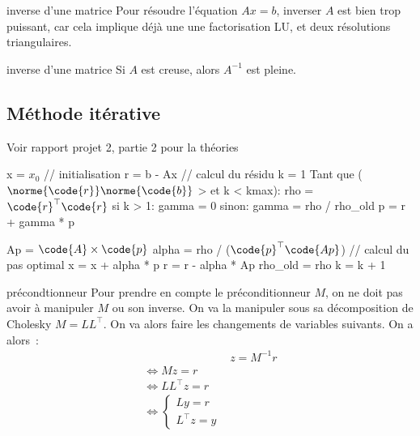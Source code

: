 \begin{remarque}{}{inverse d'une matrice}
    Pour résoudre l'équation $Ax=b$, inverser $A$ est bien trop puissant, car cela implique déjà une une factorisation LU, et deux résolutions triangulaires.
\end{remarque}

\begin{remarque}{}{inverse d'une matrice}   
    Si $A$ est creuse, alors $A^{-1}$ est pleine.
\end{remarque}


\subsection{Méthode itérative}

Voir rapport projet 2, partie 2 pour la théories


\begin{lstLNat}
    x = $x_0$ // initialisation
    r = b - Ax // calcul du résidu
    k = 1
    Tant que ($\norme{\code{r}} \norme{\code{b}}$ > \varepsilon et k < kmax):
        rho = $\code{r}^\top\code{r}$
         si k > 1:
            gamma = 0
        sinon:
            gamma = rho / rho\_old
        p = r + gamma * p
        
        Ap = $\code{A} \times \code{p}$ 
        alpha = rho / ($\code{p}^\top \code{Ap}$) // calcul du pas optimal
        x = x + alpha * p
        r = r - alpha * Ap
        rho\_old = rho
        k = k + 1
\end{lstLNat}

\begin{remarque}{}{précondtionneur}
    Pour prendre en compte le préconditionneur $M$, on ne doit pas avoir à manipuler $M$ ou son inverse. On va la manipuler sous sa décomposition de Cholesky $M = LL^\top$. On va alors faire les changements de variables suivants. On a alors~:
    \begin{align*}
        &z = M^{-1}r \\
        \iff Mz = r \\
        \iff LL^\top z = r\\
        \iff \begin{cases*}
            Ly = r\\
            L^\top z = y
        \end{cases*}
    \end{align*}
    
\end{remarque}
